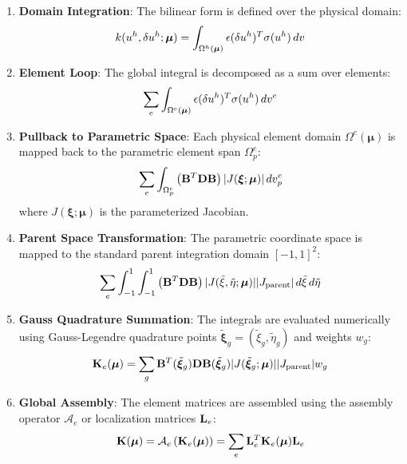 \begin{enumerate}
    \item \textbf{Domain Integration}: The bilinear form is defined over the physical domain:
          \begin{equation}
              k(u^h, \delta u^h; \boldsymbol{\mu}) = \int_{\Omega^h(\boldsymbol{\mu})} \mathbf{\epsilon}(\delta u^h)^T \mathbf{\sigma}(u^h) \, dv
          \end{equation}
    \item \textbf{Element Loop}: The global integral is decomposed as a sum over elements:
          \begin{equation}
              \sum_e \int_{\Omega^e(\boldsymbol{\mu})} \mathbf{\epsilon}(\delta u^h)^T \mathbf{\sigma}(u^h) \, dv^e
          \end{equation}
    \item \textbf{Pullback to Parametric Space}: Each physical element domain $\Omega^e(\boldsymbol{\mu})$ is mapped back to the parametric element span $\Omega_p^e$:
          \begin{equation}
              \sum_e \int_{\Omega_p^e} \left( \mathbf{B}^T \mathbf{D} \mathbf{B} \right) |J(\boldsymbol{\xi}; \boldsymbol{\mu})| \, dv_p^e
          \end{equation}
          where $J(\boldsymbol{\xi}; \boldsymbol{\mu})$ is the parameterized Jacobian.
    \item \textbf{Parent Space Transformation}: The parametric coordinate space is mapped to the standard parent integration domain $[-1, 1]^2$:
          \begin{equation}
              \sum_e \int_{-1}^{1} \int_{-1}^{1} \left( \mathbf{B}^T \mathbf{D} \mathbf{B} \right) |J(\tilde{\xi}, \tilde{\eta}; \boldsymbol{\mu})| |J_{\text{parent}}| \, d\tilde{\xi} \, d\tilde{\eta}
          \end{equation}
    \item \textbf{Gauss Quadrature Summation}: The integrals are evaluated numerically using Gauss-Legendre quadrature points $\tilde{\boldsymbol{\xi}}_g = (\tilde{\xi}_g, \tilde{\eta}_g)$ and weights $w_g$:
          \begin{equation}
              \mathbf{K}_e(\boldsymbol{\mu}) = \sum_{g} \mathbf{B}^T(\tilde{\boldsymbol{\xi}}_g) \mathbf{D} \mathbf{B}(\tilde{\boldsymbol{\xi}}_g) |J(\tilde{\boldsymbol{\xi}}_g; \boldsymbol{\mu})| |J_{\text{parent}}| w_g
          \end{equation}
    \item \textbf{Global Assembly}: The element matrices are assembled using the assembly operator $\mathcal{A}_e$ or localization matrices $\mathbf{L}_e$:
          \begin{equation}
              \mathbf{K}(\boldsymbol{\mu}) = \mathcal{A}_e \left( \mathbf{K}_e(\boldsymbol{\mu}) \right) = \sum_e \mathbf{L}_e^T \mathbf{K}_e(\boldsymbol{\mu}) \mathbf{L}_e
          \end{equation}
\end{enumerate}

